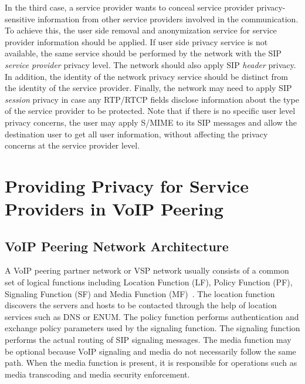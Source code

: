 \documentclass[letterpaper,notitlepage,times,12pt]{article}
\begin{document}
In the third case, a service provider wants to conceal service provider privacy-sensitive information from other service providers involved in the communication. To achieve this, the user side removal and anonymization service for service provider information should be applied. If user side privacy service is not available, the same service should be performed by the network with the SIP {\it service provider} privacy level. The network should also apply SIP {\it header} privacy. In addition, the identity of the network privacy service should be distinct from the identity of the service provider. Finally, the network may need to apply SIP {\it session} privacy in case any RTP/RTCP fields disclose information about the type of the service provider to be protected. Note that if there is no specific user level privacy concerns, the user may apply S/MIME to its SIP messages and allow the destination user to get all user information, without affecting the privacy concerns at the service provider level.
\section{Providing Privacy for Service Providers in VoIP Peering} \label{sec:pps}



\subsection{VoIP Peering Network Architecture} \label{sec:voiparch}

A VoIP peering partner network or VSP network usually consists of a common set of logical functions including Location Function (LF), Policy Function (PF), Signaling Function (SF) and Media Function (MF)~\cite{speermint:arch}. The location function discovers the servers and hosts to be contacted through the help of location services such as DNS or ENUM. The policy function performs authentication and exchange policy parameters used by the signaling function. The signaling function performs the actual routing of SIP signaling messages. The media function may be optional because VoIP signaling and media do not necessarily follow the same path. When the media function is present, it is responsible for operations such as media transcoding and media security enforcement.
\end{document}

